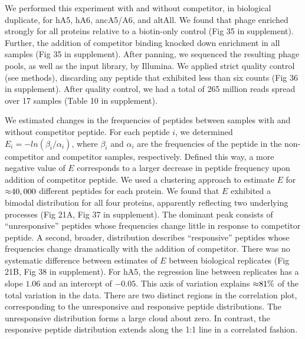 We performed this experiment with and without competitor, in biological
duplicate, for hA5, hA6, ancA5/A6, and altAll. We found that phage
enriched strongly for all proteins relative to a biotin-only control
(Fig 35 in supplement). Further, the addition of competitor binding knocked down
enrichment in all samples (Fig 35 in supplement). After panning, we sequenced the
resulting phage pools, as well as the input library, by Illumina.
We applied strict quality control (see methods), discarding any peptide
that exhibited less than six counts (Fig 36 in supplement). After
quality control, we had a total of 265 million reads spread over 17
samples (Table 10 in supplement). 

We estimated changes in the frequencies of peptides between samples
with and without competitor peptide. For each peptide $i$, we determined
$E_{i}=-ln(\beta_{i}/\alpha_{i})$, where $\beta_{i}$ and $\alpha_{i}$
are the frequencies of the peptide in the non-competitor and competitor
samples, respectively. Defined this way, a more negative value of
$E$ corresponds to a larger decrease in peptide frequency upon addition
of competitor peptide. We used a clustering approach to estimate $E$
for $\text{\ensuremath{\approx}}40,000$ different peptides for each
protein. We found that $E$ exhibited a bimodal distribution for all
four proteins, apparently reflecting two underlying processes (Fig
21A, Fig 37 in supplement). The dominant peak consists of ``unresponsive'' peptides
whose frequencies change little in response to competitor peptide.
A second, broader, distribution describes ``responsive'' peptides
whose frequencies change dramatically with the addition of competitor.
There was no systematic difference between estimates of $E$ between
biological replicates (Fig 21B, Fig 38 in supplement). For hA5, the regression line
between replicates has a slope $1.06$ and an intercept of $-0.05$.
This axis of variation explains $\text{\ensuremath{\approx}}81\%$
of the total variation in the data. There are two distinct regions
in the correlation plot, corresponding to the unresponsive and responsive
peptide distributions. The unresponsive distribution forms a large
cloud about zero. In contrast, the responsive peptide distribution
extends along the 1:1 line in a correlated fashion. 

